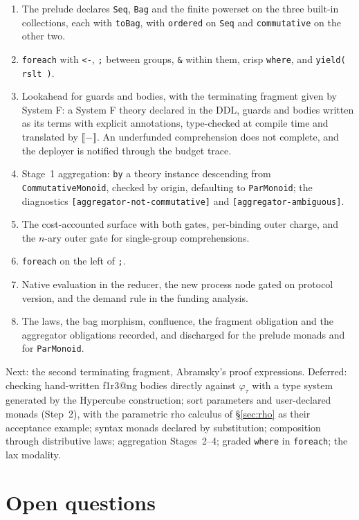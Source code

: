 \documentclass[11pt]{article}
\makeatletter
\theoremstyle{definition}
\theoremstyle{plain}
\theoremstyle{remark}
\newcommand{\rhoc}{\textsf{rho}}
\newcommand{\sem}[1]{\llbracket #1 \rrbracket}
\newcommand{\fe}{\texttt{foreach}}
\newcommand{\flang}{\textsf{f1r3\textbar @ng}}
\makeatother
\begin{document}
\begin{enumerate}[nosep]
\item The prelude declares \texttt{Seq}, \texttt{Bag} and the finite powerset on
the three built-in collections, each with \texttt{toBag}, with
\texttt{ordered} on \texttt{Seq} and \texttt{commutative} on the other two.
\item \fe{} with \texttt{<-}, \texttt{;} between groups, \texttt{\&} within
them, crisp \texttt{where}, and \texttt{yield( rslt )}.
\item Lookahead for guards and bodies, with the terminating fragment given by
System F: a System F theory declared in the DDL, guards and bodies written as its
terms with explicit annotations, type-checked at compile time and translated by
\(\sem{-}\). An underfunded comprehension does not complete, and the deployer
is notified through the budget trace.
\item Stage~1 aggregation: \texttt{by} a theory instance descending from
\texttt{CommutativeMonoid}, checked by origin, defaulting to
\texttt{ParMonoid}; the diagnostics \texttt{[aggregator-not-commutative]} and
\texttt{[aggregator-ambiguous]}.
\item The cost-accounted surface with both gates, per-binding outer charge, and
the \(n\)-ary outer gate for single-group comprehensions.
\item \fe{} on the left of \texttt{;}.
\item Native evaluation in the reducer, the new process node gated on protocol
version, and the demand rule in the funding analysis.
\item The laws, the bag morphism, confluence, the fragment obligation and the
aggregator obligations recorded, and discharged for the prelude monads and for
\texttt{ParMonoid}.
\end{enumerate}

\noindent
Next: the second terminating fragment, Abramsky's proof expressions.
Deferred: checking hand-written \flang{} bodies directly against
\(\varphi_\tau\) with a type system generated by the Hypercube construction;
sort parameters and user-declared monads (Step~2), with the
parametric \rhoc{} calculus of \S\ref{sec:rho} as their acceptance example;
syntax monads declared by substitution; composition through distributive laws;
aggregation Stages~2--4; graded \texttt{where} in \fe{}; the lax modality.

\section{Open questions}
\label{sec:questions}
\end{document}
